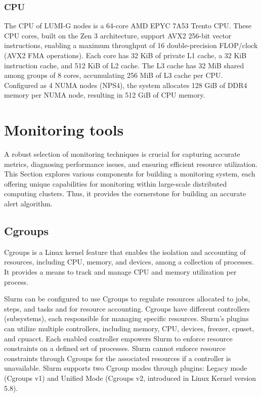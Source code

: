 \subsubsection{CPU}

The CPU of LUMI-G nodes is a 64-core AMD EPYC 7A53 Trento CPU. These CPU cores, built on the Zen 3 architecture, support AVX2 256-bit vector instructions, enabling a maximum throughput of 16 double-precision FLOP/clock (AVX2 FMA operations). Each core has 32 KiB of private L1 cache, a 32 KiB instruction cache, and 512 KiB of L2 cache. The L3 cache has 32 MiB shared among groups of 8 cores, accumulating 256 MiB of L3 cache per CPU. Configured as 4 NUMA nodes (NPS4), the system allocates 128 GiB of DDR4 memory per NUMA node, resulting in 512 GiB of CPU memory.

\section{Monitoring tools}
A robust selection of monitoring techniques is crucial for capturing accurate metrics, diagnosing performance issues, and ensuring efficient resource utilization. This Section explores various components for building a monitoring system, each offering unique capabilities for monitoring within large-scale distributed computing clusters. Thus, it provides the cornerstone for building an accurate alert algorithm.

\subsection{Cgroups}
Cgroups \cite{7876184} is a Linux kernel feature that enables the isolation and accounting of resources, including CPU, memory, and devices, among a collection of processes. It provides a means to track and manage CPU and memory utilization per process.

Slurm can be configured to use Cgroups to regulate resources allocated to jobs, steps, and tasks and for resource accounting. Cgroups have different controllers (subsystems), each responsible for managing specific resources. Slurm's plugins can utilize multiple controllers, including memory, CPU, devices, freezer, cpuset, and cpuacct. Each enabled controller empowers Slurm to enforce resource constraints on a defined set of processes. Slurm cannot enforce resource constraints through Cgroups for the associated resources if a controller is unavailable. Slurm supports two Cgroup modes through plugins: Legacy mode (Cgroups v1) and Unified Mode (Cgroups v2, introduced in Linux Kernel version 5.8).

